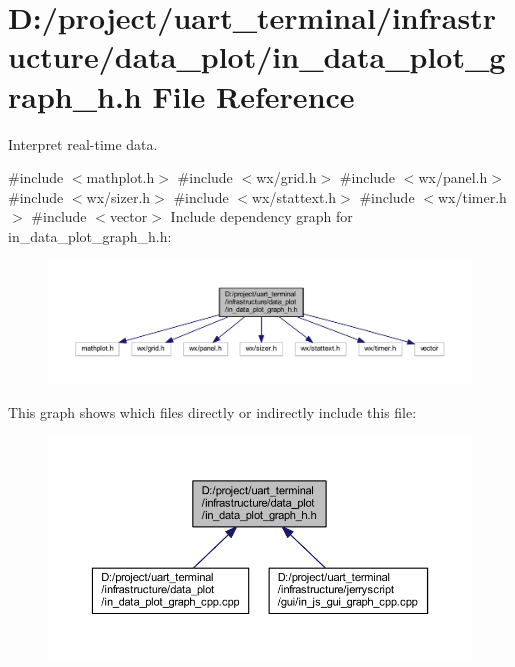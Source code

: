 \section{D\+:/project/uart\+\_\+terminal/infrastructure/data\+\_\+plot/in\+\_\+data\+\_\+plot\+\_\+graph\+\_\+h.h File Reference}
\label{in__data__plot__graph__h_8h}


Interpret real-\/time data.  


{\ttfamily \#include $<$mathplot.\+h$>$}\newline
{\ttfamily \#include $<$wx/grid.\+h$>$}\newline
{\ttfamily \#include $<$wx/panel.\+h$>$}\newline
{\ttfamily \#include $<$wx/sizer.\+h$>$}\newline
{\ttfamily \#include $<$wx/stattext.\+h$>$}\newline
{\ttfamily \#include $<$wx/timer.\+h$>$}\newline
{\ttfamily \#include $<$vector$>$}\newline
Include dependency graph for in\+\_\+data\+\_\+plot\+\_\+graph\+\_\+h.\+h\+:\nopagebreak
\begin{figure}[H]
\begin{center}
\leavevmode
\includegraphics[width=350pt]{in__data__plot__graph__h_8h__incl}
\end{center}
\end{figure}
This graph shows which files directly or indirectly include this file\+:\nopagebreak
\begin{figure}[H]
\begin{center}
\leavevmode
\includegraphics[width=350pt]{in__data__plot__graph__h_8h__dep__incl}
\end{center}
\end{figure}
